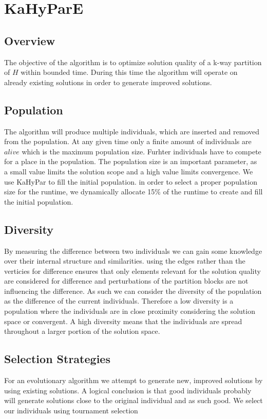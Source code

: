 \documentclass[a4paper,12pt,bibtotoc,titlepage, liststotoc,BCOR7mm,headsepline,pointlessnumbers]{scrbook}
\numberwithin{equation}{section}
\begin{document}
\chapter{KaHyParE}
\section{Overview}
The objective of the algorithm is to optimize solution quality of a k-way partition of $H$ within bounded time. During this time
the algorithm will operate on already existing solutions in order to generate improved solutions. 
\section{Population}
The algorithm will produce multiple individuals, which are inserted and removed from the population. At any given time only a finite amount of
individuals are $alive$ which is the maximum population size. Furhter individuals have to compete for a place in the population. 
The population size is an important parameter, as a small value limits the solution scope and a high value limits convergence.
We use KaHyPar to fill the initial population.
in order to select a proper population size for the runtime, we dynamically allocate 15\% of the runtime to create and fill the initial population.
\section{Diversity}
By measuring the difference between two individuals we can gain some knowledge over their internal structure and similarities.
using the edges rather than the verticies for difference ensures that only elements relevant for the solution quality are considered
for difference and perturbations of the partition blocks are not influencing the difference. As such we can consider the diversity of
the population as the difference of the current individuals. Therefore a low diversity is a population where the individuals are 
in close proximity considering the solution space or convergent. A high diversity means that the individuals are spread throughout a 
larger portion of the solution space.  
\section{Selection Strategies}
For an evolutionary algorithm we attempt to generate new, improved solutions by using existing solutions. A logical conclusion is that good individuals probably will generate solutions
close to the original individual and as such good. We select our individuals using tournament selection %
\end{document}
